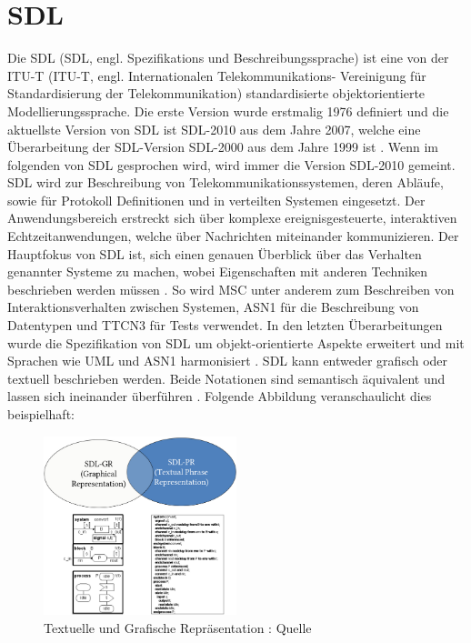 \section{\acf{SDL}}
\label{sc:SDL}
Die \acs{SDL} (\ac{SDL}, engl. Spezifikations und Beschreibungssprache) ist eine von der \ac{ITU-T} (\ac{ITU-T}, engl. Internationalen 
Telekommunikations- Vereinigung für Standardisierung der Telekommunikation) standardisierte objektorientierte Modellierungssprache. Die erste Version wurde erstmalig 
1976 definiert und die aktuellste Version von \ac{SDL} ist \ac{SDL}-2010 aus dem Jahre 2007, welche eine Überarbeitung der \ac{SDL}-Version \ac{SDL}-2000 aus dem Jahre 
1999 ist \cite[vii,51]{ITUT100_2016}. Wenn im folgenden von \ac{SDL} gesprochen wird, wird immer die Version \acs{SDL}-2010 gemeint. 
\ac{SDL} wird zur Beschreibung von Telekommunikationssystemen, deren Abläufe, sowie für Protokoll Definitionen und in verteilten Systemen eingesetzt.
Der Anwendungsbereich erstreckt sich über komplexe ereignisgesteuerte, interaktiven Echtzeitanwendungen, welche über Nachrichten miteinander kommunizieren. 
Der Hauptfokus von \ac{SDL} ist, sich einen genauen Überblick über das Verhalten genannter Systeme zu machen, wobei Eigenschaften mit anderen Techniken beschrieben werden müssen \cite[1\psq]{ITUT100_2016}. 
So wird \ac{MSC} unter anderem zum Beschreiben von Interaktionsverhalten zwischen Systemen, \ac{ASN1} für die Beschreibung von Datentypen und \ac{TTCN3} für Tests verwendet. In den letzten Überarbeitungen wurde die Spezifikation von \ac{SDL} um objekt-orientierte Aspekte erweitert und mit Sprachen wie \ac{UML} und \ac{ASN1} harmonisiert \cite[vii\psqq]{ITUT100_2016}. \ac{SDL} kann entweder grafisch oder textuell beschrieben werden. Beide Notationen sind semantisch äquivalent und lassen sich ineinander überführen \cite[3]{Weber_2008}. Folgende Abbildung veranschaulicht dies beispielhaft:

\begin{figure}[h]
	\centering
	\includegraphics[width=0.5\textwidth]{Graphics/TextUndGrafik.png}
	\caption{Textuelle und Grafische Repräsentation : Quelle \cite{Reed_2000}}
	\label{fig:TextUndGrafik}
\end{figure}

